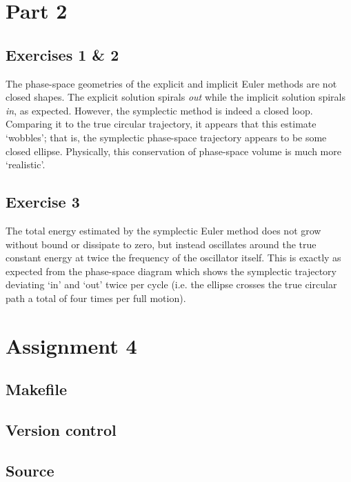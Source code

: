 \documentclass{article}
\theoremstyle{definition}
\begin{document}
\section*{Part 2} 
\subsection*{Exercises 1 \& 2}
The phase-space geometries of the explicit and implicit Euler methods are not closed shapes. The explicit solution spirals \textit{out} while the implicit solution spirals \textit{in}, as expected. However, the symplectic method is indeed a closed loop. Comparing it to the true circular trajectory, it appears that this estimate `wobbles'; that is, the symplectic phase-space trajectory appears to be some closed ellipse. Physically, this conservation of phase-space volume is much more `realistic'.

\subsection*{Exercise 3}
The total energy estimated by the symplectic Euler method does not grow without bound or dissipate to zero, but instead oscillates around the true constant energy at twice the frequency of the oscillator itself. This is exactly as expected from the phase-space diagram which shows the symplectic trajectory deviating `in' and `out' twice per cycle (i.e. the ellipse crosses the true circular path a total of four times per full motion). 



\section*{Assignment 4}
\subsection*{Makefile}


\subsection*{Version control}



\subsection*{Source}

\end{document}
